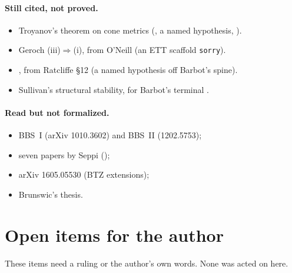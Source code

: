 \paragraph{Still cited, not proved.}
\begin{itemize}
\item Troyanov's theorem on cone metrics (, a named
  hypothesis, ).
\item Geroch (iii)$\Rightarrow$(i), from O'Neill (an ETT scaffold \texttt{sorry}).
\item {}, from Ratcliffe §12 (a named hypothesis off Barbot's spine).
\item Sullivan's structural stability, for Barbot's terminal .
\end{itemize}

\paragraph{Read but not formalized.}
\begin{itemize}
\item BBS~I (arXiv 1010.3602) and BBS~II (1202.5753);
\item seven papers by Seppi ();
\item arXiv 1605.05530 (BTZ extensions);
\item Brunswic's thesis.
\end{itemize}

\section{Open items for the author}\label{sec:open}

These items need a ruling or the author's own words. None was acted on here.


